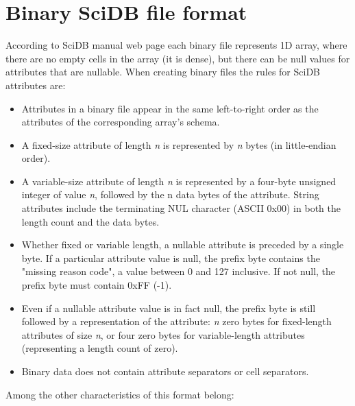 \chapter{Binary SciDB file format} \label{binForm}
According to SciDB manual web page \cite{scidbBinForm} each binary file represents 1D array, where there are no empty cells in the array (it is dense), but there can be null values for attributes that are nullable. When creating binary files the rules for SciDB attributes are:
\begin{itemize}
\item Attributes in a binary file appear in the same left-to-right order as the attributes of the corresponding array's schema.
\item A fixed-size attribute of length \textit{n} is represented by \textit{n} bytes (in little-endian order).
\item A variable-size attribute of length \textit{n} is represented by a four-byte unsigned integer of value \textit{n}, followed by the n data bytes of the attribute. String attributes include the terminating NUL character (ASCII 0x00) in both the length count and the data bytes.
\item Whether fixed or variable length, a nullable attribute is preceded by a single byte. If a particular attribute value is null, the prefix byte contains the "missing reason code", a value between 0 and 127 inclusive. If not null, the prefix byte must contain 0xFF (-1).
\item Even if a nullable attribute value is in fact null, the prefix byte is still followed by a representation of the attribute: \textit{n} zero bytes for fixed-length attributes of size \textit{n}, or four zero bytes for variable-length attributes (representing a length count of zero).
\item Binary data does not contain attribute separators or cell separators.
\end{itemize}
Among the other characteristics of this format belong:

